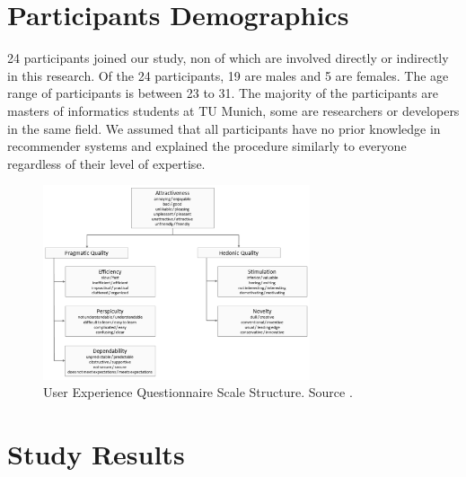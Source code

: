 \section{Participants Demographics}
24 participants joined our study, non of which are involved directly or
indirectly in this research.
Of the 24 participants, 19 are males and 5 are females. The age range of
participants is between 23 to 31. The majority of the participants are masters
of informatics students at TU Munich, some are researchers or developers in the
same field. We assumed that all participants have no prior knowledge in
recommender systems and explained the procedure similarly to everyone regardless
of their level of expertise.

\begin{figure}[t]
\centering
\includegraphics[width=0.7\textwidth]{figures/UEQ-scales}
\caption{User Experience Questionnaire Scale Structure. Source
\cite{UEQHandbook}.}
\label{fig:figure512}
\end{figure}

\section{Study Results}

